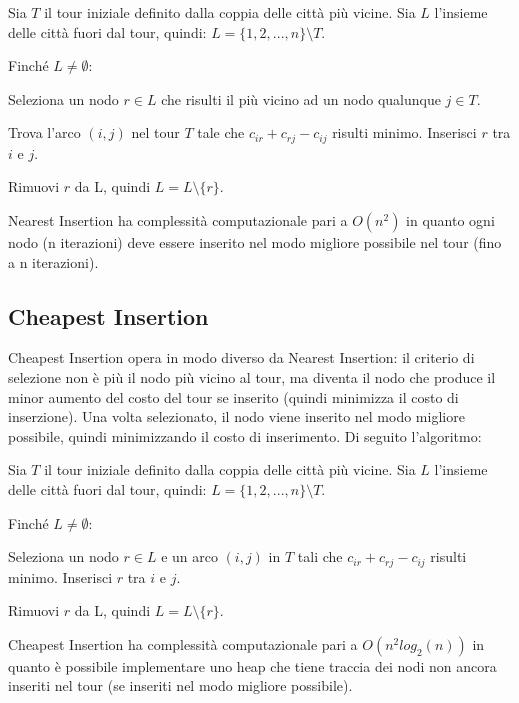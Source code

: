 \documentclass[a4paper,12pt]{report}
\begin{document}
\begin{legal}
  \item Sia $T$ il tour iniziale definito dalla coppia delle città più vicine. Sia $L$ l'insieme delle città fuori dal tour, quindi: $L = \{1, 2, ..., n\} \setminus T$.
  \item Finché $L \neq \emptyset$:
  \begin{legal}
    \item Seleziona un nodo $r \in L$ che risulti il più vicino ad un nodo qualunque $j \in T$.
    \item Trova l'arco $(i, j)$ nel tour $T$ tale che $c_{ir} + c_{rj} - c_{ij}$ risulti minimo. Inserisci $r$ tra $i$ e $j$.  
    \item Rimuovi $r$ da L, quindi $L = L \setminus \{r\}$.
  \end{legal}
\end{legal}
\hfill \break Nearest Insertion ha complessità computazionale pari a $O(n^2)$ in quanto ogni nodo (n iterazioni) deve essere inserito nel modo migliore possibile nel tour (fino a n iterazioni).

\subsection{Cheapest Insertion}
Cheapest Insertion opera in modo diverso da Nearest Insertion: il criterio di selezione non è più il nodo più vicino al tour, ma diventa il nodo che produce il minor aumento del costo del tour se inserito (quindi minimizza il costo di inserzione). Una volta selezionato, il nodo viene inserito nel modo migliore possibile, quindi minimizzando il costo di inserimento. Di seguito l'algoritmo:

\begin{legal}
  \item Sia $T$ il tour iniziale definito dalla coppia delle città più vicine. Sia $L$ l'insieme delle città fuori dal tour, quindi: $L = \{1, 2, ..., n\} \setminus T$.
  \item Finché $L \neq \emptyset$:
  \begin{legal}
    \item Seleziona un nodo $r \in L$ e un arco $(i, j)$ in $T$ tali che $c_{ir} + c_{rj} - c_{ij}$ risulti minimo. Inserisci $r$ tra $i$ e $j$.  
    \item Rimuovi $r$ da L, quindi $L = L \setminus \{r\}$.
  \end{legal}
\end{legal}
\hfill \break Cheapest Insertion ha complessità computazionale pari a $O(n^2 log_2(n))$ in quanto è possibile implementare uno heap che tiene traccia dei nodi non ancora inseriti nel tour (se inseriti nel modo migliore possibile).
\end{document}
